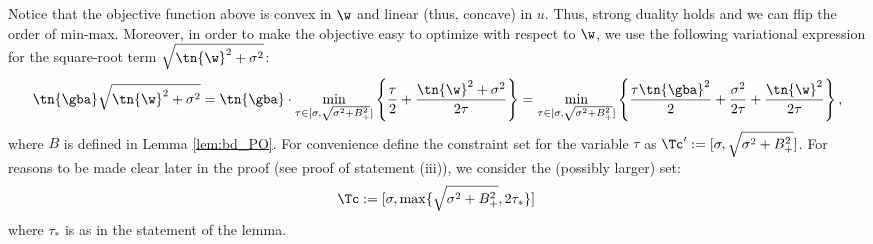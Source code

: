  Notice that the objective function above is convex in $\w$ and linear (thus, concave) in $u$. Thus, strong duality holds and we can flip the order of min-max. Moreover, in order to make the objective easy to optimize with respect to $\w$, we use the following variational expression for the square-root term $\sqrt{\tn{\w}^2+\sigma^2}$:
$$
\tn{\gba}\sqrt{\tn{\w}^2+\sigma^2} = \tn{\gba}\cdot\min_{\tau\in[\sigma,\sqrt{\sigma^2+B_+^2}]} \left\{ \frac{\tau}{2} + \frac{\tn{\w}^2+\sigma^2}{2\tau} \right\} = \min_{\tau\in[\sigma,\sqrt{\sigma^2+B_+^2}]} \left\{ \frac{\tau\tn{\gba}^2}{2} + \frac{\sigma^2}{2\tau} + \frac{\tn{\w}^2}{2\tau} \right\},
$$
where $B$ is defined in Lemma \ref{lem:bd_PO}. For convenience define the constraint set for the variable $\tau$ as $\Tc':=[\sigma,\sqrt{\sigma^2+B_+^2}]$. For reasons to be made clear later in the proof (see proof of statement (iii)), we consider the (possibly larger) set:
\[
\Tc:=[\sigma,\max\{\sqrt{\sigma^2+B_+^2},2\tau_*\}]\,
\]
where $\tau_*$ is as in the statement of the lemma.

